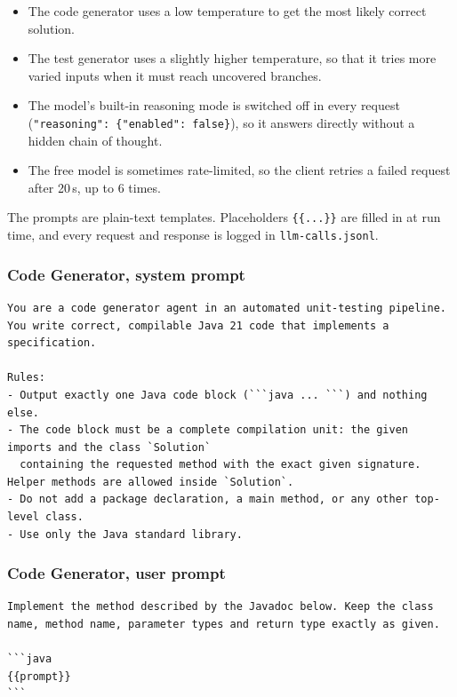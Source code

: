 \documentclass[11pt,a4paper]{article}
\begin{document}
\begin{itemize}
  \item The code generator uses a low temperature to get the most likely correct solution.
  \item The test generator uses a slightly higher temperature, so that it tries more varied inputs when it must reach uncovered branches.
  \item The model's built-in reasoning mode is switched off in every request (\texttt{"reasoning": \{"enabled": false\}}), so it answers directly without a hidden chain of thought.
  \item The free model is sometimes rate-limited, so the client retries a failed request after 20\,s, up to 6 times.
\end{itemize}

\noindent The prompts are plain-text templates. Placeholders \texttt{\{\{...\}\}} are filled in at run time, and every request and response is logged in \texttt{llm-calls.jsonl}.

\subsubsection*{Code Generator, system prompt}
\begin{lstlisting}[style=prompt]
You are a code generator agent in an automated unit-testing pipeline.
You write correct, compilable Java 21 code that implements a specification.

Rules:
- Output exactly one Java code block (```java ... ```) and nothing else.
- The code block must be a complete compilation unit: the given imports and the class `Solution`
  containing the requested method with the exact given signature. Helper methods are allowed inside `Solution`.
- Do not add a package declaration, a main method, or any other top-level class.
- Use only the Java standard library.
\end{lstlisting}
\subsubsection*{Code Generator, user prompt}
\begin{lstlisting}[style=prompt]
Implement the method described by the Javadoc below. Keep the class name, method name, parameter types and return type exactly as given.

```java
{{prompt}}
```
\end{lstlisting}
\end{document}
